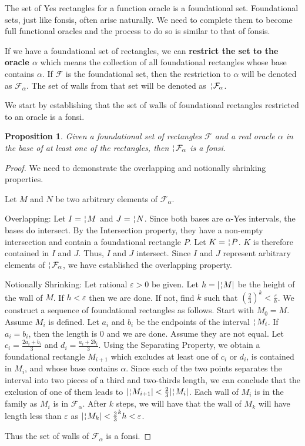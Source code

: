 \documentclass[12pt]{article}
\newtheorem{proposition}{Proposition}[subsection]
\begin{document}
The set of Yes rectangles for a function oracle is a foundational set. Foundational sets, just like fonsis, often arise naturally. We need to complete them to become full functional oracles and the process to do so is similar to that of fonsis. 

If we have a foundational set of rectangles, we can \textbf{restrict the set to the oracle $\alpha$} which means the collection of all foundational rectangles whose base contains $\alpha$. If $\mathcal{F}$ is the foundational set, then the restriction to $\alpha$ will be denoted as $\mathcal{F}_{\alpha}$. The set of walls from that set will be denoted as $\wall{\mathcal{F}_{\alpha}}$.

We start by establishing that the set of walls of foundational rectangles restricted to an oracle is a fonsi. 

\begin{proposition}
    Given a foundational set of rectangles $\mathcal{F}$ and a real oracle $\alpha$ in the base of at least one of the rectangles, then $\wall{\mathcal{F}_{\alpha}}$ is a fonsi. 
\end{proposition}

\begin{proof}
    We need to demonstrate the overlapping and notionally shrinking properties. 

    Let $M$ and $N$ be two arbitrary elements of $\mathcal{F}_{\alpha}$.

Overlapping: Let $I = \wall{M}$ and $J= \wall{N}$. Since both bases are $\alpha$-Yes intervals, the bases do intersect. By the Intersection property, they have a non-empty intersection and contain a foundational rectangle $P$. Let $K = \wall{P}$. $K$ is therefore contained in $I$ and $J$. Thus, $I$ and $J$ intersect. Since $I$ and $J$ represent arbitrary elements of $\wall{\mathcal{F}_{\alpha}}$, we have established the overlapping property. 

Notionally Shrinking: Let rational $\varepsilon > 0$ be given. Let $h = |\wall{M}|$ be the height of the wall of $M$. If $h < \varepsilon$ then we are done. If not, find $k$ such that $(\frac{2}{3})^k < \frac{\varepsilon}{h}$. We construct a sequence of foundational rectangles as follows. Start with $M_0= M$. Assume $M_i$ is defined. Let $a_i$ and $b_i$ be the endpoints of the interval $\wall{M_i}$. If $a_i=b_i$, then the length is 0 and we are done. Assume they are not equal. Let $c_i =\frac{2a_i + b_i}{3}$ and $d_i = \frac{a_i +2b_i}{3}$. Using the Separating Property, we obtain a foundational rectangle $M_{i+1}$ which excludes at least one of $c_i$ or $d_i$, is contained in $M_i$, and whose base contains $\alpha$. Since each of the two points separates the interval into two pieces of a third and two-thirds length, we can conclude that the exclusion of one of them leads to $|\wall{M_{i+1}}| < \frac{2}{3} |\wall{M_i}|$. Each wall of $M_i$ is in the family as $M_i$ is in $\mathcal{F}_{\alpha}$. After $k$ steps, we will have that the wall of $M_k$ will have length less than $\varepsilon$ as $|\wall{M_k}| < \frac{2}{3}^k h < \varepsilon$.  

Thus the set of walls of $\mathcal{F}_{\alpha}$ is a fonsi.
\end{proof}
\end{document}
